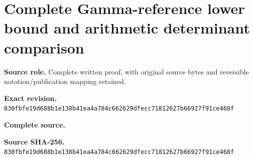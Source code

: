 \begingroup
\sloppy
\small
\section{Complete Gamma-reference lower bound and arithmetic determinant comparison}
\noindent\textbf{Source role.} Complete written proof, with original source bytes and reversible notation/publication mapping retained.\par
\noindent\textbf{Exact revision.} \nolinkurl{830fbfe19d688b1e138b41ea4a784c662629dfecc71812627b66927f91ce468f}\par
\noindent\textbf{Complete source.} \par
\noindent\textbf{Source SHA-256.} \nolinkurl{830fbfe19d688b1e138b41ea4a784c662629dfecc71812627b66927f91ce468f}\par\medskip

\endgroup
